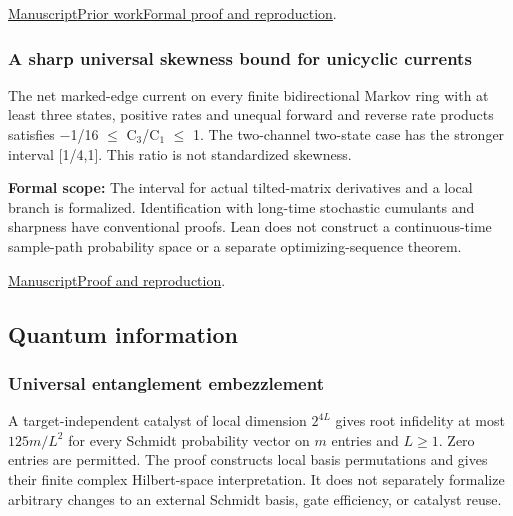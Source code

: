 \documentclass[11pt,a4paper]{article}
\begin{document}
\par\smallskip
\noindent\href{https://github.com/dvgyl/math-and-theory/blob/main/papers/physics/thermal-kurtosis-counterexample/report.pdf}{Manuscript}\quad\href{https://github.com/dvgyl/math-and-theory/blob/main/papers/physics/thermal-kurtosis-counterexample/RELATED_WORK.md}{Prior work}\quad\href{https://github.com/dvgyl/math-and-theory/blob/main/papers/physics/thermal-kurtosis-counterexample/README.md}{Formal proof and reproduction}.

\subsubsection{A sharp universal skewness bound for unicyclic currents}

The net marked-edge current on every finite bidirectional Markov ring with at least three states, positive rates and unequal forward and reverse rate products satisfies $-$1/16 $\leq$ C$_3$/C$_1$ $\leq$ 1. The two-channel two-state case has the stronger interval [1/4,1]. This ratio is not standardized skewness.

\noindent\textbf{Formal scope:} The interval for actual tilted-matrix derivatives and a local branch is formalized. Identification with long-time stochastic cumulants and sharpness have conventional proofs. Lean does not construct a continuous-time sample-path probability space or a separate optimizing-sequence theorem.

\href{https://github.com/dvgyl/math-and-theory/blob/main/papers/physics/unicyclic-skewness/manuscript.pdf}{Manuscript}\quad\href{https://github.com/dvgyl/math-and-theory/blob/main/papers/physics/unicyclic-skewness/README.md}{Proof and reproduction}.

\subsection{Quantum information}

\subsubsection{Universal entanglement embezzlement}

A target-independent catalyst of local dimension $2^{4L}$ gives root infidelity at most $125m/L^2$ for every Schmidt probability vector on $m$ entries and $L\geq1$. Zero entries are permitted. The proof constructs local basis permutations and gives their finite complex Hilbert-space interpretation. It does not separately formalize arbitrary changes to an external Schmidt basis, gate efficiency, or catalyst reuse.
\end{document}
